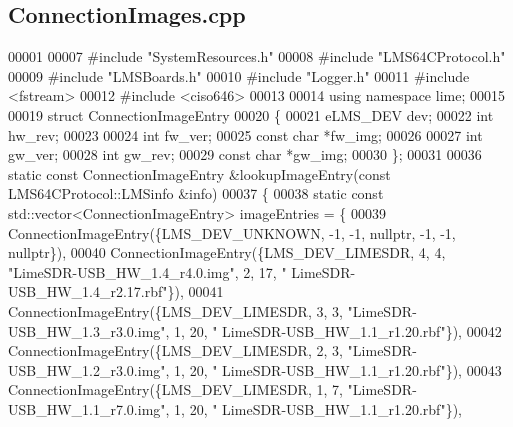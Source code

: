 \subsection{Connection\+Images.\+cpp}
\label{ConnectionImages_8cpp_source}

\begin{DoxyCode}
00001 
00007 \textcolor{preprocessor}{#include "SystemResources.h"}
00008 \textcolor{preprocessor}{#include "LMS64CProtocol.h"}
00009 \textcolor{preprocessor}{#include "LMSBoards.h"}
00010 \textcolor{preprocessor}{#include "Logger.h"}
00011 \textcolor{preprocessor}{#include <fstream>}
00012 \textcolor{preprocessor}{#include <ciso646>}
00013 
00014 \textcolor{keyword}{using namespace }lime;
00015 
00019 \textcolor{keyword}{struct }ConnectionImageEntry
00020 \{
00021     eLMS_DEV dev;
00022     \textcolor{keywordtype}{int} hw_rev;
00023 
00024     \textcolor{keywordtype}{int} fw_ver;
00025     \textcolor{keyword}{const} \textcolor{keywordtype}{char} *fw_img;
00026 
00027     \textcolor{keywordtype}{int} gw_ver;
00028     \textcolor{keywordtype}{int} gw_rev;
00029     \textcolor{keyword}{const} \textcolor{keywordtype}{char} *gw_img;
00030 \};
00031 
00036 \textcolor{keyword}{static} \textcolor{keyword}{const} ConnectionImageEntry &lookupImageEntry(\textcolor{keyword}{const} 
      LMS64CProtocol::LMSinfo &info)
00037 \{
00038     \textcolor{keyword}{static} \textcolor{keyword}{const} std::vector<ConnectionImageEntry> imageEntries = \{
00039         ConnectionImageEntry(\{LMS_DEV_UNKNOWN, -1, -1, \textcolor{keyword}{nullptr}, -1, -1, \textcolor{keyword}{nullptr}\}),
00040         ConnectionImageEntry(\{LMS_DEV_LIMESDR, 4, 4, \textcolor{stringliteral}{"LimeSDR-USB\_HW\_1.4\_r4.0.img"}, 2, 17,  \textcolor{stringliteral}{"
      LimeSDR-USB\_HW\_1.4\_r2.17.rbf"}\}),
00041         ConnectionImageEntry(\{LMS_DEV_LIMESDR, 3, 3, \textcolor{stringliteral}{"LimeSDR-USB\_HW\_1.3\_r3.0.img"}, 1, 20, \textcolor{stringliteral}{"
      LimeSDR-USB\_HW\_1.1\_r1.20.rbf"}\}),
00042         ConnectionImageEntry(\{LMS_DEV_LIMESDR, 2, 3, \textcolor{stringliteral}{"LimeSDR-USB\_HW\_1.2\_r3.0.img"}, 1, 20, \textcolor{stringliteral}{"
      LimeSDR-USB\_HW\_1.1\_r1.20.rbf"}\}),
00043         ConnectionImageEntry(\{LMS_DEV_LIMESDR, 1, 7, \textcolor{stringliteral}{"LimeSDR-USB\_HW\_1.1\_r7.0.img"}, 1, 20, \textcolor{stringliteral}{"
      LimeSDR-USB\_HW\_1.1\_r1.20.rbf"}\}),

\end{DoxyCode}
